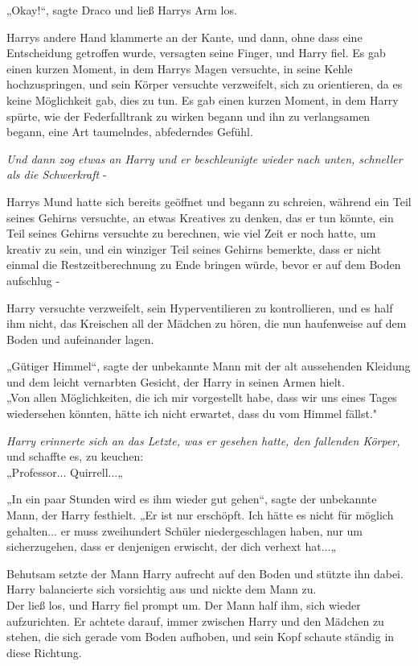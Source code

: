 {„Okay!“, sagte Draco und ließ Harrys Arm los.

Harrys andere Hand klammerte an der Kante, und dann, ohne dass eine Entscheidung getroffen wurde, versagten seine Finger, und Harry fiel. Es gab einen kurzen Moment, in dem Harrys Magen versuchte, in seine Kehle hochzuspringen, und sein Körper versuchte verzweifelt, sich zu orientieren, da es keine Möglichkeit gab, dies zu tun. Es gab einen kurzen Moment, in dem Harry spürte, wie der Federfalltrank zu wirken begann und ihn zu verlangsamen begann, eine Art taumelndes, abfederndes Gefühl.

\emph{Und dann zog etwas an Harry und er beschleunigte wieder nach unten, schneller als die Schwerkraft} -

Harrys Mund hatte sich bereits geöffnet und begann zu schreien, während ein Teil seines Gehirns versuchte, an etwas Kreatives zu denken, das er tun könnte, ein Teil seines Gehirns versuchte zu berechnen, wie viel Zeit er noch hatte, um kreativ zu sein, und ein winziger Teil seines Gehirns bemerkte, dass er nicht einmal die Restzeitberechnung zu Ende bringen würde, bevor er auf dem Boden aufschlug -

Harry versuchte verzweifelt, sein Hyperventilieren zu kontrollieren, und es half ihm nicht, das Kreischen all der Mädchen zu hören, die nun haufenweise auf dem Boden und aufeinander lagen.

„Gütiger Himmel“, sagte der unbekannte Mann mit der alt aussehenden Kleidung und dem leicht vernarbten Gesicht, der Harry in seinen Armen hielt.\\ „Von allen Möglichkeiten, die ich mir vorgestellt habe, dass wir uns eines Tages wiedersehen könnten, hätte ich nicht erwartet, dass du vom Himmel fällst."

\emph{Harry erinnerte sich an das Letzte, was er gesehen hatte, den fallenden Körper,} und schaffte es, zu keuchen:\\ „Professor... Quirrell...„

„In ein paar Stunden wird es ihm wieder gut gehen“, sagte der unbekannte Mann, der Harry festhielt. „Er ist nur erschöpft. Ich hätte es nicht für möglich gehalten... er muss zweihundert Schüler niedergeschlagen haben, nur um sicherzugehen, dass er denjenigen erwischt, der dich verhext hat...„

Behutsam setzte der Mann Harry aufrecht auf den Boden und stützte ihn dabei. Harry balancierte sich vorsichtig aus und nickte dem Mann zu.\\ Der ließ los, und Harry fiel prompt um. Der Mann half ihm, sich wieder aufzurichten. Er achtete darauf, immer zwischen Harry und den Mädchen zu stehen, die sich gerade vom Boden aufhoben, und sein Kopf schaute ständig in diese Richtung.

}
